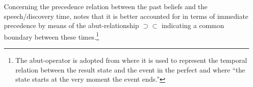 \documentclass[output=paper,
colorlinks,
citecolor=brown,
newtxmath
]{langscibook}
\begin{document}
Concerning the precedence relation between the past beliefs and the speech/\hspace{0pt}discovery time, \citet[58]{Bustamante2013} notes that it is better accounted for in terms of immediate precedence by means of the abut-relationship $\supset \subset$ indicating a common boundary between these times.\footnote{The abut-operator is adopted from \citet[573]{Kamp.Reyle1993} where it is used to represent the temporal relation between the result state and the event in the perfect and where ``the state starts at the very moment the event ends.''}
\end{document}
